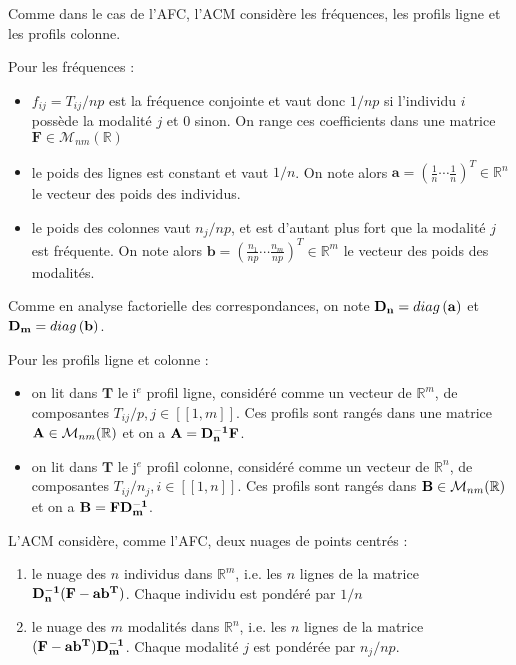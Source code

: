 \documentclass[letterpaper,10pt,english]{jupyterBook}
\begin{document}
\sphinxAtStartPar
Comme dans le cas de l’AFC, l’ACM considère les fréquences, les profils ligne et les profils colonne.

\sphinxAtStartPar
Pour les fréquences :
\begin{itemize}
\item {} 
\sphinxAtStartPar
\(f_{ij}=T_{ij}/np\) est la fréquence conjointe et vaut donc \(1/np\) si l’individu \(i\) possède la modalité \(j\) et 0 sinon. On range ces coefficients dans une matrice \(\mathbf{F}\in\mathcal{M}_{nm}(\mathbb{R})\)

\item {} 
\sphinxAtStartPar
le poids des lignes est constant et vaut \(1/n\). On note alors \(\mathbf{a} = (\frac{1}{n}\cdots \frac{1}{n})^T\in\mathbb{R}^n\) le vecteur des poids des individus.

\item {} 
\sphinxAtStartPar
le poids des colonnes vaut \(n_j/np\), et est d’autant plus fort que la modalité \(j\) est fréquente. On note alors \(\mathbf{b} = (\frac{n_1}{np}\cdots \frac{n_m}{np})^T\in\mathbb{R}^m\) le vecteur des poids des modalités.

\end{itemize}

\sphinxAtStartPar
Comme en analyse factorielle des correspondances, on note \({\bf D_n}=diag\left ({\bf a}\right )\) et \({\bf D_m}=diag\left ({\bf b} \right )\).

\sphinxAtStartPar
Pour les profils ligne et colonne :
\begin{itemize}
\item {} 
\sphinxAtStartPar
on lit dans \(\mathbf T\) le i\(^e\) profil ligne, considéré comme un vecteur de \(\mathbb{R}^m\), de composantes \(T_{ij}/p,j\in[\![1,m]\!]\). Ces profils sont rangés dans une matrice \({\bf A}\in\mathcal{M}_{nm}(\mathbb{R})\) et on a \({\bf A}={\bf D_n^{-1}F}\).

\item {} 
\sphinxAtStartPar
on lit dans \(\mathbf T\) le j\(^e\) profil colonne, considéré comme un vecteur de \(\mathbb{R}^n\), de composantes \(T_{ij}/n_j,i\in[\![1,n]\!]\). Ces profils sont rangés dans \({\bf B}\in\mathcal{M}_{nm}(\mathbb{R})\) et on a \({\bf B}={\bf FD_m^{-1}}\).

\end{itemize}

\sphinxAtStartPar
L’ACM considère, comme l’AFC, deux nuages de points centrés :
\begin{enumerate}
%
\item {} 
\sphinxAtStartPar
le nuage des \(n\) individus dans \(\mathbb{R}^m\), i.e. les \(n\) lignes de la matrice \({\bf D_n^{-1}(F-ab^T})\). Chaque individu est pondéré par \(1/n\)

\item {} 
\sphinxAtStartPar
le nuage des \(m\) modalités dans \(\mathbb{R}^n\), i.e. les \(n\) lignes de la matrice \({\bf (F-ab^T)D_m^{-1}}\). Chaque modalité \(j\) est pondérée par \(n_j/np\).

\end{enumerate}
\end{document}

